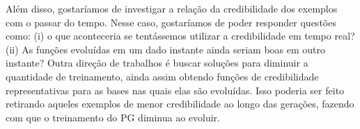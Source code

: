 Além disso, gostaríamos de investigar a relação da credibilidade dos exemplos com o passar do tempo. Nesse caso, gostaríamos de poder responder questões como: (i) o que aconteceria se tentássemos utilizar a credibilidade em tempo real? (ii) As funções evoluídas em um dado instante ainda seriam boas em outro instante? Outra direção de trabalhos é buscar soluções para diminuir a quantidade de treinamento, ainda assim obtendo funções de credibilidade representativas para as bases nas quais elas são evoluídas. Isso poderia ser feito retirando aqueles exemplos de menor credibilidade ao longo das gerações, fazendo com que o treinamento do \textsc{PG} diminua ao evoluir.


